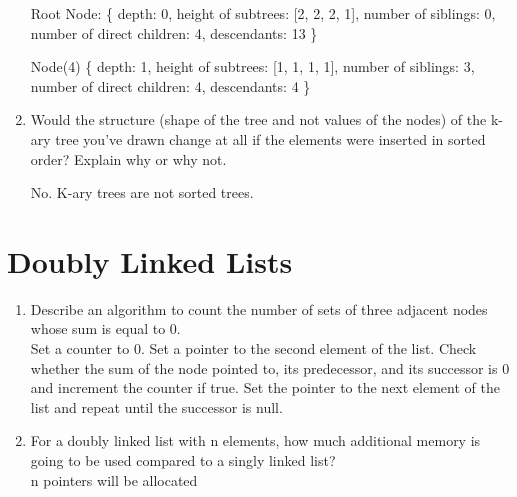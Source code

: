 \documentclass[11pt]{article}
\begin{document}
\begin{enumerate}

        Root Node: \{ depth: 0, height of subtrees: [2, 2, 2, 1], number of siblings: 0, number of direct children: 4, descendants: 13 \}

        Node(4) \{ depth: 1, height of subtrees: [1, 1, 1, 1], number of siblings: 3, number of direct children: 4, descendants: 4 \}
        
        \item Would the structure (shape of the tree and not values of the nodes) of the k-ary tree you've drawn change at all if the elements were inserted in sorted order? Explain why or why not.

        No. K-ary trees are not sorted trees.
    \end{enumerate}
    
    \section{Doubly Linked Lists}
    
    \begin{enumerate}
    
        \item Describe an algorithm to count the number of sets of three adjacent nodes whose sum is equal to 0.\\
        Set a counter to 0. Set a pointer to the second element of the list. Check whether the sum of the node pointed to, its predecessor, and its successor is 0 and increment the counter if true. Set the pointer to the next element of the list and repeat until the successor is null.
        
        \item For a doubly linked list with n elements, how much additional memory is going to be used compared to a singly linked list?\\
        n pointers will be allocated
    
    \end{enumerate}
    
\end{document}
